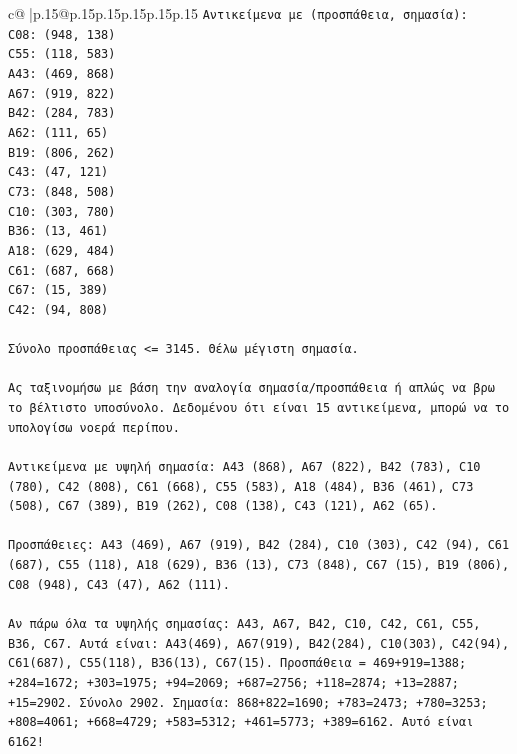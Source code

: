 \documentclass{article}
\begin{document}
{\begin{supertabular}{c@{$\;$}|p{.15\linewidth}@{}p{.15\linewidth}p{.15\linewidth}p{.15\linewidth}p{.15\linewidth}p{.15\linewidth}}
{{{\texttt{Αντικείμενα με (προσπάθεια, σημασία):} \\
\texttt{C08: (948, 138)} \\
\texttt{C55: (118, 583)} \\
\texttt{A43: (469, 868)} \\
\texttt{A67: (919, 822)} \\
\texttt{B42: (284, 783)} \\
\texttt{A62: (111, 65)} \\
\texttt{B19: (806, 262)} \\
\texttt{C43: (47, 121)} \\
\texttt{C73: (848, 508)} \\
\texttt{C10: (303, 780)} \\
\texttt{B36: (13, 461)} \\
\texttt{A18: (629, 484)} \\
\texttt{C61: (687, 668)} \\
\texttt{C67: (15, 389)} \\
\texttt{C42: (94, 808)} \\
\\ 
\texttt{Σύνολο προσπάθειας <= 3145. Θέλω μέγιστη σημασία.} \\
\\ 
\texttt{Ας ταξινομήσω με βάση την αναλογία σημασία/προσπάθεια ή απλώς να βρω το βέλτιστο υποσύνολο. Δεδομένου ότι είναι 15 αντικείμενα, μπορώ να το υπολογίσω νοερά περίπου.} \\
\\ 
\texttt{Αντικείμενα με υψηλή σημασία: A43 (868), A67 (822), B42 (783), C10 (780), C42 (808), C61 (668), C55 (583), A18 (484), B36 (461), C73 (508), C67 (389), B19 (262), C08 (138), C43 (121), A62 (65).} \\
\\ 
\texttt{Προσπάθειες: A43 (469), A67 (919), B42 (284), C10 (303), C42 (94), C61 (687), C55 (118), A18 (629), B36 (13), C73 (848), C67 (15), B19 (806), C08 (948), C43 (47), A62 (111).} \\
\\ 
\texttt{Αν πάρω όλα τα υψηλής σημασίας: A43, A67, B42, C10, C42, C61, C55, B36, C67. Αυτά είναι: A43(469), A67(919), B42(284), C10(303), C42(94), C61(687), C55(118), B36(13), C67(15). Προσπάθεια = 469+919=1388; +284=1672; +303=1975; +94=2069; +687=2756; +118=2874; +13=2887; +15=2902. Σύνολο 2902. Σημασία: 868+822=1690; +783=2473; +780=3253; +808=4061; +668=4729; +583=5312; +461=5773; +389=6162. Αυτό είναι 6162!} \\
\\ 
}}}
\end{supertabular}}
\end{document}
